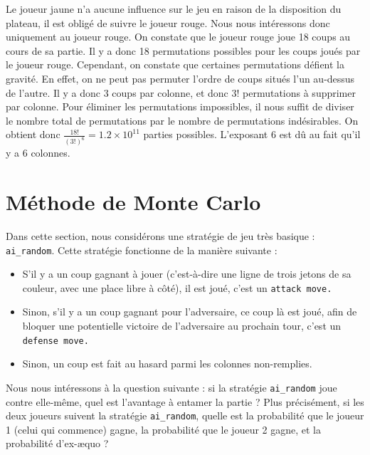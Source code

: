 \documentclass[11pt,answers]{exam}
\begin{document}
\begin{solutionbox}{210mm}
Le joueur jaune n'a aucune influence sur le jeu en raison de la disposition du plateau, il est obligé de suivre le joueur rouge. \newline
Nous nous intéressons donc uniquement au joueur rouge. On constate que le joueur rouge joue 18 coups au cours de sa partie. \newline 
Il y a donc 18 permutations possibles pour les coups joués par le joueur rouge. Cependant, on constate que certaines permutations défient la gravité. \newline
En effet, on ne peut pas permuter l'ordre de coups situés l'un au-dessus de l'autre. Il y a donc 3 coups par colonne, et donc 3! permutations à supprimer par colonne. \newline
Pour éliminer les permutations impossibles, il nous suffit de diviser le nombre total de permutations par le nombre de permutations indésirables.
On obtient donc $\frac{18!}{(3!)^6} = 1.2 \times 10^{11}$
 parties possibles. L'exposant 6 est dû au fait qu'il y a 6 colonnes.

\end{solutionbox}

\newpage

\section{Méthode de Monte Carlo}

Dans cette section, nous considérons une stratégie de jeu très basique : \texttt{ai\_random}. Cette stratégie fonctionne de la manière suivante :
\begin{itemize}
    \item S'il y a un coup gagnant à jouer (c'est-à-dire une ligne de trois jetons de sa couleur, avec une place libre à côté), il est joué, c'est un \texttt{attack move.}
    \item Sinon, s'il y a un coup gagnant pour l'adversaire, ce coup là est joué, afin de bloquer une potentielle victoire de l'adversaire au prochain tour, c'est un \texttt{defense move.}
    \item Sinon, un coup est fait au hasard parmi les colonnes non-remplies.
\end{itemize}

Nous nous intéressons à la question suivante : si la stratégie \texttt{ai\_random} joue contre elle-même, quel est l'avantage à entamer la partie ? Plus précisément, si les deux joueurs suivent la stratégie \texttt{ai\_random}, quelle est la probabilité que le joueur 1 (celui qui commence) gagne, la probabilité que le joueur 2 gagne, et la probabilité d'ex-æquo ?
\end{document}
